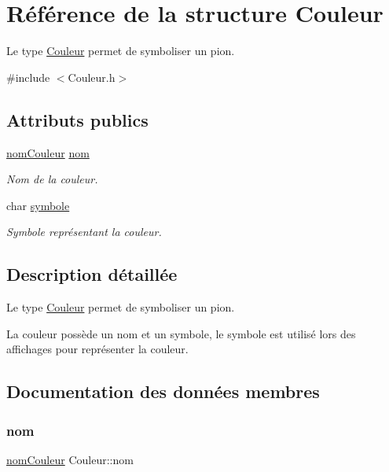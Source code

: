 \hypertarget{structCouleur}{}\section{Référence de la structure Couleur}
\label{structCouleur}


Le type \hyperlink{structCouleur}{Couleur} permet de symboliser un pion.  




{\ttfamily \#include $<$Couleur.\+h$>$}

\subsection*{Attributs publics}
\begin{DoxyCompactItemize}
\item 
\hyperlink{Couleur_8h_aaca4e6192fa64673e34ef06ceb76bb16}{nom\+Couleur} \hyperlink{structCouleur_a0083f38ad28cc4b9ca57356fa0440ee9}{nom}
\begin{DoxyCompactList}\small\item\em Nom de la couleur. \end{DoxyCompactList}\item 
char \hyperlink{structCouleur_a4da2f2ca44f4b0c7c963afd7339f2600}{symbole}
\begin{DoxyCompactList}\small\item\em Symbole représentant la couleur. \end{DoxyCompactList}\end{DoxyCompactItemize}


\subsection{Description détaillée}
Le type \hyperlink{structCouleur}{Couleur} permet de symboliser un pion. 

La couleur possède un nom et un symbole, le symbole est utilisé lors des affichages pour représenter la couleur. 

\subsection{Documentation des données membres}
\mbox{\label{structCouleur_a0083f38ad28cc4b9ca57356fa0440ee9}} 
\subsubsection{\texorpdfstring{nom}{nom}}
{\footnotesize\ttfamily \hyperlink{Couleur_8h_aaca4e6192fa64673e34ef06ceb76bb16}{nom\+Couleur} Couleur\+::nom}



